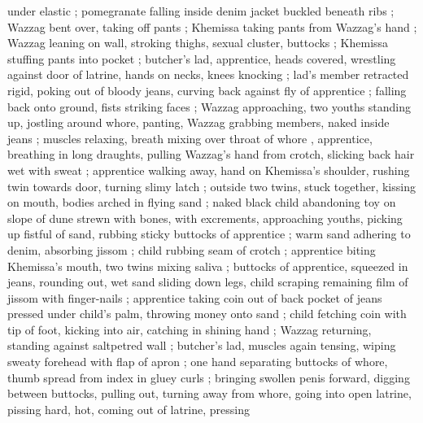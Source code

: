under elastic ; pomegranate falling inside denim jacket buckled beneath ribs  ; Wazzag bent over, taking off pants ; Khemissa taking pants from Wazzag's hand ; Wazzag leaning on wall, stroking thighs, sexual cluster, buttocks ; Khemissa stuffing pants into pocket ; butcher's lad, apprentice, heads covered, wrestling against door of latrine, hands on necks, knees knocking ; lad's member retracted rigid, poking out of bloody jeans, curving back against fly of apprentice ; falling back onto ground, fists striking faces ; Wazzag approaching, two youths standing up, jostling around whore, panting, Wazzag grabbing members, naked inside jeans ; muscles relaxing, breath mixing over throat of whore , apprentice, breathing in long draughts, pulling Wazzag's hand from crotch, slicking back hair wet with sweat  ; apprentice walking away, hand on Khemissa's shoulder, rushing twin towards door, turning slimy latch  ; outside {\td} two twins, stuck together, kissing on mouth, bodies arched in flying sand ; naked black child abandoning toy on slope of dune strewn with bones, with excrements, approaching youths, picking up fistful of sand, rubbing sticky buttocks of apprentice ; warm sand adhering to denim, absorbing jissom ; child rubbing seam of crotch ; apprentice biting Khemissa's mouth, two twins mixing saliva ; buttocks of apprentice, squeezed in jeans, rounding out, wet sand sliding down legs, child scraping remaining film of jissom with finger-nails ; apprentice taking coin out of back pocket of jeans pressed under child's palm, throwing money onto sand ; child fetching coin with tip of foot, kicking into air, catching in shining hand ; Wazzag returning, standing against saltpetred wall ; butcher's lad, muscles again tensing, wiping sweaty forehead with flap of apron ; one hand separating buttocks of whore, thumb spread from index in gluey curls ; bringing swollen penis forward, digging between buttocks, pulling out, turning away from whore, going into open latrine, pissing hard, hot, coming out of latrine, pressing 
